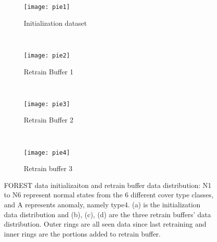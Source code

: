 \begin{figure}[t]
\centering
	\begin {subfigure}[t]{0.45\textwidth}
	\centering
	\texttt{[image: pie1]}
	\caption{Initialization dataset}
	\label{fig:init}
	\end{subfigure}
	~
	\begin {subfigure}[t]{0.45\textwidth}
	\centering
	\texttt{[image: pie2]}
	\caption{Retrain Buffer 1}
	\label{fig:buf1}
	\end{subfigure}
	~
	\begin {subfigure}[t]{0.45\textwidth}
	\centering
	\texttt{[image: pie3]}
	\caption{Retrain Buffer 2}
	\label{fig:buf2}
	\end{subfigure}
	~
	\begin {subfigure}[t]{0.45\textwidth}
	\centering
	\texttt{[image: pie4]}
	\caption{Retrain buffer 3}
	\label{fig:buf3}
	\end{subfigure}

	\caption[FOREST data initializaiton and retrain buffer data distribution]{FOREST data initializaiton and retrain buffer data distribution: N1 to N6 represent normal states from the 6 different cover type classes, and A represents anomaly, namely type4. (a) is the initialization data distribution and (b), (c), (d) are the three retrain buffers' data distribution. Outer rings are all seen data since last retraining and inner rings are the portions added to retrain buffer.}
\label{fig:bufs}
\end{figure}








